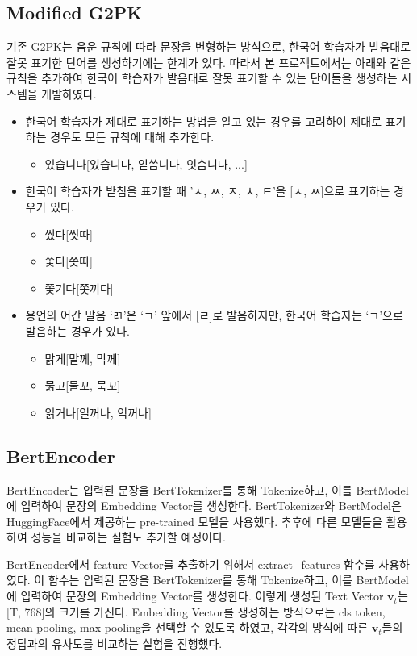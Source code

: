 \documentclass[letterpaper]{article} %
\begin{document}
\subsection{Modified G2PK}
기존 G2PK는 음운 규칙에 따라 문장을 변형하는 방식으로, 한국어 학습자가 발음대로 잘못 표기한 단어를 생성하기에는 한계가 있다.
따라서 본 프로젝트에서는 아래와 같은 규칙을 추가하여 한국어 학습자가 발음대로 잘못 표기할 수 있는 단어들을 생성하는 시스템을 개발하였다.
\begin{itemize}
  \item 한국어 학습자가 제대로 표기하는 방법을 알고 있는 경우를 고려하여 제대로 표기하는 경우도 모든 규칙에 대해 추가한다.
  \begin{itemize}
    \item 있습니다[있습니다, 읻씀니다, 잇슴니다, ...]
  \end{itemize}
  \item 한국어 학습자가 받침을 표기할 때 'ㅅ, ㅆ, ㅈ, ㅊ, ㅌ'을 [ㅅ, ㅆ]으로 표기하는 경우가 있다.
  \begin{itemize}
    \item 썼다[썻따]
    \item 쫓다[쫏따]
    \item 쫓기다[쫏끼다]
  \end{itemize}
  \item 용언의 어간 말음 `ㄺ'은 `ㄱ' 앞에서 [ㄹ]로 발음하지만, 한국어 학습자는 `ㄱ'으로 발음하는 경우가 있다.
  \begin{itemize}
    \item 맑게[말께, 막께]
    \item 묽고[물꼬, 묵꼬]
    \item 읽거나[일꺼나, 익꺼나]
  \end{itemize}
\end{itemize}


\subsection{BertEncoder}
BertEncoder는 입력된 문장을 BertTokenizer를 통해 Tokenize하고, 이를 BertModel에 입력하여 문장의 Embedding Vector를 생성한다.
BertTokenizer와 BertModel은 HuggingFace에서 제공하는 pre-trained 모델을 사용했다. 추후에 다른 모델들을 활용하여 성능을 비교하는 실험도 추가할 예정이다.

BertEncoder에서 feature Vector를 추출하기 위해서 extract\_features 함수를 사용하였다. 이 함수는 입력된 문장을 BertTokenizer를 통해 Tokenize하고, 이를 BertModel에 입력하여 문장의 Embedding Vector를 생성한다.
이렇게 생성된 Text Vector $\mathbf{v}_t$는 [T, 768]의 크기를 가진다.
Embedding Vector를 생성하는 방식으로는 cls token, mean pooling, max pooling을 선택할 수 있도록 하였고, 각각의 방식에 따른 $\mathbf{v}_t$들의 정답과의 유사도를 비교하는 실험을 진행했다.
\end{document}
